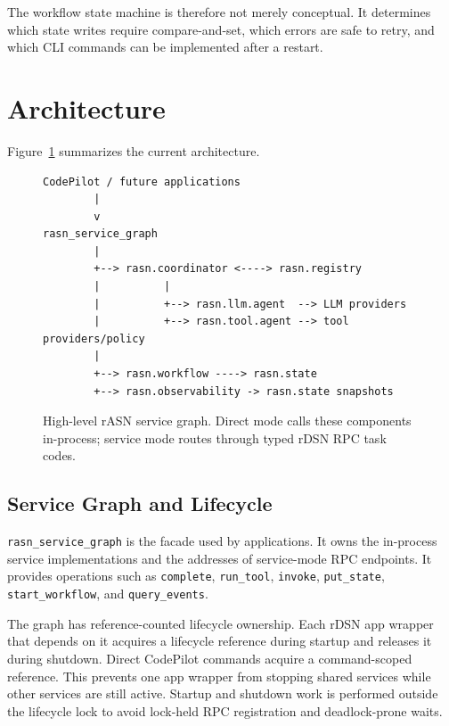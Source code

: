 \documentclass[manuscript,screen,review]{acmart}
\newcommand{\rasn}{rASN\xspace}
\newcommand{\rdsn}{rDSN\xspace}
\newcommand{\codepilot}{CodePilot\xspace}
\begin{document}
The workflow state machine is therefore not merely conceptual. It determines
which state writes require compare-and-set, which errors are safe to retry, and
which CLI commands can be implemented after a restart.

\section{Architecture}

Figure~\ref{fig:architecture} summarizes the current architecture.

\begin{figure}[t]
\centering
\begin{lstlisting}
CodePilot / future applications
        |
        v
rasn_service_graph
        |
        +--> rasn.coordinator <----> rasn.registry
        |          |
        |          +--> rasn.llm.agent  --> LLM providers
        |          +--> rasn.tool.agent --> tool providers/policy
        |
        +--> rasn.workflow ----> rasn.state
        +--> rasn.observability -> rasn.state snapshots
\end{lstlisting}
\caption{High-level \rasn service graph. Direct mode calls these components
in-process; service mode routes through typed \rdsn RPC task codes.}
\label{fig:architecture}
\end{figure}

\subsection{Service Graph and Lifecycle}

\texttt{rasn\_service\_graph} is the facade used by applications. It owns the
in-process service implementations and the addresses of service-mode RPC
endpoints. It provides operations such as \texttt{complete},
\texttt{run\_tool}, \texttt{invoke}, \texttt{put\_state},
\texttt{start\_workflow}, and \texttt{query\_events}.

The graph has reference-counted lifecycle ownership. Each \rdsn app wrapper
that depends on it acquires a lifecycle reference during startup and releases
it during shutdown. Direct \codepilot commands acquire a command-scoped
reference. This prevents one app wrapper from stopping shared services while
other services are still active. Startup and shutdown work is performed outside
the lifecycle lock to avoid lock-held RPC registration and deadlock-prone waits.
\end{document}
